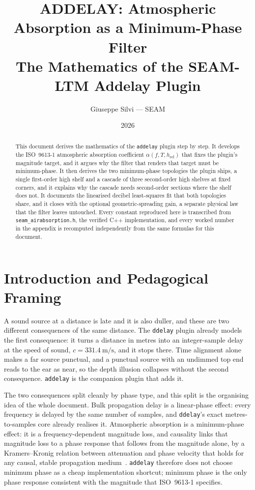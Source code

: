 \documentclass[11pt,a4paper]{article}
\title{ADDELAY: Atmospheric Absorption as a Minimum-Phase Filter\\\large The Mathematics of the SEAM-LTM Addelay Plugin}
\author{Giuseppe Silvi --- SEAM}
\date{2026}
\begin{document}
\maketitle
\begin{abstract}
This document derives the mathematics of the \texttt{addelay} plugin step by step.
It develops the ISO~9613-1 atmospheric absorption coefficient $\alpha(f,T,h_\text{rel})$ that fixes the plugin's magnitude target, and it argues why the filter that renders that target must be minimum-phase.
It then derives the two minimum-phase topologies the plugin ships, a single first-order high shelf and a cascade of three second-order high shelves at fixed corners, and it explains why the cascade needs second-order sections where the shelf does not.
It documents the linearised decibel least-squares fit that both topologies share, and it closes with the optional geometric-spreading gain, a separate physical law that the filter leaves untouched.
Every constant reproduced here is transcribed from \texttt{seam\_airabsorption.h}, the verified C++ implementation, and every worked number in the appendix is recomputed independently from the same formulas for this document.
\end{abstract}
\tableofcontents

\section{Introduction and Pedagogical Framing}
\label{sec:intro}

A sound source at a distance is late and it is also duller, and these are two different consequences of the same distance.
The \texttt{ddelay} plugin already models the first consequence: it turns a distance in metres into an integer-sample delay at the speed of sound, $c = \SI{331.4}{\meter\per\second}$, and it stops there.
Time alignment alone makes a far source punctual, and a punctual source with an undimmed top end reads to the ear as near, so the depth illusion collapses without the second consequence.
\texttt{addelay} is the companion plugin that adds it.

The two consequences split cleanly by phase type, and this split is the organising idea of the whole document.
Bulk propagation delay is a linear-phase effect: every frequency is delayed by the same number of samples, and \texttt{ddelay}'s exact metres-to-samples core already realises it.
Atmospheric absorption is a minimum-phase effect: it is a frequency-dependent magnitude loss, and causality links that magnitude loss to a phase response that follows from the magnitude alone, by a Kramers--Kronig relation between attenuation and phase velocity that holds for any causal, stable propagation medium~\cite{ODonnellJaynesMiller1981}.
\texttt{addelay} therefore does not choose minimum phase as a cheap implementation shortcut; minimum phase is the only phase response consistent with the magnitude that ISO~9613-1 specifies.
\end{document}
